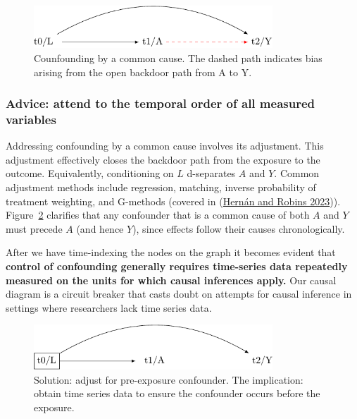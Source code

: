 \documentclass[
  singlecolumn]{article}
\begin{document}
\begin{figure}

{\centering \includegraphics[width=0.8\textwidth,height=\textheight]{causal-dags_files/figure-pdf/fig-dag-common-cause-1.pdf}

}

\caption{\label{fig-dag-common-cause}Counfounding by a common cause. The
dashed path indicates bias arising from the open backdoor path from A to
Y.}

\end{figure}

\hypertarget{advice-attend-to-the-temporal-order-of-all-measured-variables}{%
\subsubsection{Advice: attend to the temporal order of all measured
variables}\label{advice-attend-to-the-temporal-order-of-all-measured-variables}}

Addressing confounding by a common cause involves its adjustment. This
adjustment effectively closes the backdoor path from the exposure to the
outcome. Equivalently, conditioning on \(L\) d-separates \(A\) and
\(Y\). Common adjustment methods include regression, matching, inverse
probability of treatment weighting, and G-methods (covered in
(\protect\hyperlink{ref-hernuxe1n2023}{Hernán and Robins 2023})).
Figure~\ref{fig-dag-common-cause-solution} clarifies that any confounder
that is a common cause of both \(A\) and \(Y\) must precede \(A\) (and
hence \(Y\)), since effects follow their causes chronologically.

After we have time-indexing the nodes on the graph it becomes evident
that \textbf{control of confounding generally requires time-series data
repeatedly measured on the units for which causal inferences apply.} Our
causal diagram is a circuit breaker that casts doubt on attempts for
causal inference in settings where researchers lack time series data.

\begin{figure}

{\centering \includegraphics[width=0.8\textwidth,height=\textheight]{causal-dags_files/figure-pdf/fig-dag-common-cause-solution-1.pdf}

}

\caption{\label{fig-dag-common-cause-solution}Solution: adjust for
pre-exposure confounder. The implication: obtain time series data to
ensure the confounder occurs before the exposure.}

\end{figure}
\end{document}
